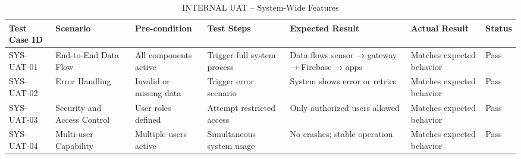 {	\begin{table}[H]
		\centering
		\caption{INTERNAL UAT – System-Wide Features}
		\renewcommand{\arraystretch}{1.2}
		\begin{adjustbox}{max width=\textwidth}
			\begin{tabular}{p{2cm}p{3cm}p{3cm}p{3cm}p{4cm}p{4cm}p{1.5cm}}
				\toprule
				\textbf{Test Case ID} & \textbf{Scenario} & \textbf{Pre-condition} & \textbf{Test Steps} & \textbf{Expected Result} & \textbf{Actual Result} & \textbf{Status} \\
				\midrule
				SYS-UAT-01 & End-to-End Data Flow & All components active & Trigger full system process & Data flows sensor → gateway → Firebase → apps & Matches expected behavior & Pass \\
				SYS-UAT-02 & Error Handling & Invalid or missing data & Trigger error scenario & System shows error or retries & Matches expected behavior & Pass \\
				SYS-UAT-03 & Security and Access Control & User roles defined & Attempt restricted access & Only authorized users allowed & Matches expected behavior & Pass \\
				SYS-UAT-04 & Multi-user Capability & Multiple users active & Simultaneous system usage & No crashes; stable operation & Matches expected behavior & Pass \\
				\bottomrule
			\end{tabular}
		\end{adjustbox}
	\end{table}
	
}
